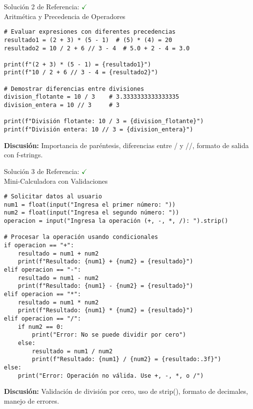 \documentclass[10pt]{beamer}
\begin{document}
\begin{frame}[fragile]{Solución 2 de Referencia: \hfill \textcolor{green}{$\checkmark$} \\ Aritmética y Precedencia de Operadores}
\begin{verbatim}
# Evaluar expresiones con diferentes precedencias
resultado1 = (2 + 3) * (5 - 1)  # (5) * (4) = 20
resultado2 = 10 / 2 + 6 // 3 - 4  # 5.0 + 2 - 4 = 3.0

print(f"(2 + 3) * (5 - 1) = {resultado1}")
print(f"10 / 2 + 6 // 3 - 4 = {resultado2}")

# Demostrar diferencias entre divisiones
division_flotante = 10 / 3    # 3.3333333333333335
division_entera = 10 // 3     # 3

print(f"División flotante: 10 / 3 = {division_flotante}")
print(f"División entera: 10 // 3 = {division_entera}")
\end{verbatim}
\textbf{Discusión:} Importancia de paréntesis, diferencias entre / y //, formato de salida con f-strings.
\end{frame}

\begin{frame}[fragile]{Solución 3 de Referencia: \hfill \textcolor{green}{$\checkmark$} \\ Mini-Calculadora con Validaciones}
\begin{verbatim}
# Solicitar datos al usuario
num1 = float(input("Ingresa el primer número: "))
num2 = float(input("Ingresa el segundo número: "))
operacion = input("Ingresa la operación (+, -, *, /): ").strip()

# Procesar la operación usando condicionales
if operacion == "+":
    resultado = num1 + num2
    print(f"Resultado: {num1} + {num2} = {resultado}")
elif operacion == "-":
    resultado = num1 - num2
    print(f"Resultado: {num1} - {num2} = {resultado}")
elif operacion == "*":
    resultado = num1 * num2
    print(f"Resultado: {num1} * {num2} = {resultado}")
elif operacion == "/":
    if num2 == 0:
        print("Error: No se puede dividir por cero")
    else:
        resultado = num1 / num2
        print(f"Resultado: {num1} / {num2} = {resultado:.3f}")
else:
    print("Error: Operación no válida. Use +, -, *, o /")
\end{verbatim}
\textbf{Discusión:} Validación de división por cero, uso de strip(), formato de decimales, manejo de errores.
\end{frame}
\end{document}
